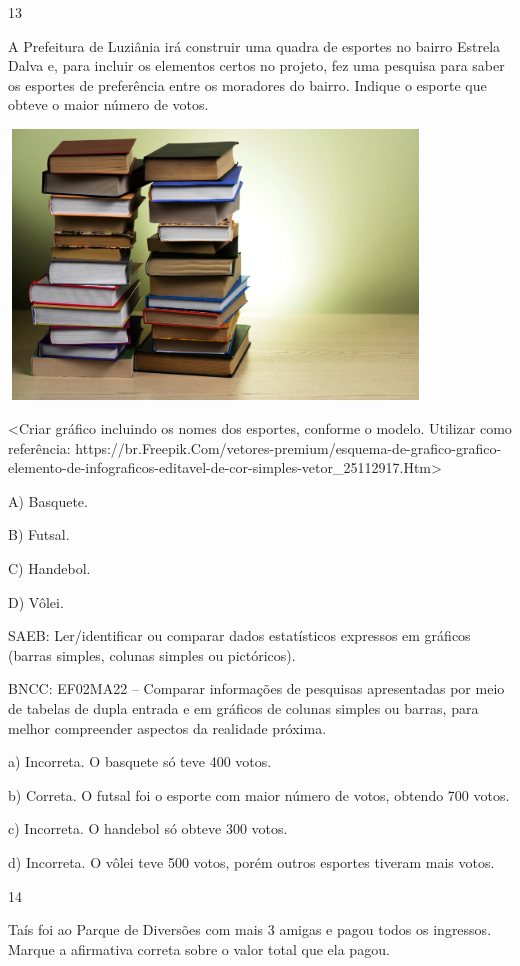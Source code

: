 \begin{escolha}
\begin{escolha}
{{{{\num{13}

A Prefeitura de Luziânia irá construir uma quadra de esportes no bairro
Estrela Dalva e, para incluir os elementos certos no projeto, fez uma
pesquisa para saber os esportes de preferência entre os moradores
do bairro. Indique o esporte que obteve o maior número de votos.

\includegraphics[width=4.32292in,height=2.82791in]{media/image123.png}

\textless{}Criar gráfico incluindo os nomes dos esportes, conforme o
modelo. Utilizar como referência:
https://br.Freepik.Com/vetores-premium/esquema-de-grafico-grafico-elemento-de-infograficos-editavel-de-cor-simples-vetor\_25112917.Htm\textgreater{}

A) Basquete.

B) Futsal.

C) Handebol.

D) Vôlei.

SAEB: Ler/identificar ou comparar dados estatísticos expressos
em gráficos (barras simples, colunas simples ou pictóricos).

BNCC: EF02MA22 -- Comparar informações de pesquisas apresentadas por meio
de tabelas de dupla entrada e em gráficos de colunas simples ou barras,
para melhor compreender aspectos da realidade próxima.

a) Incorreta. O basquete só teve 400 votos.

b) Correta. O futsal foi o esporte com maior número de votos, obtendo 700 votos.

c) Incorreta. O handebol só obteve 300 votos.

d) Incorreta. O vôlei teve 500 votos, porém outros esportes tiveram mais votos.

\num{14}

Taís foi ao Parque de Diversões com mais 3 amigas e pagou todos os ingressos. Marque a afirmativa correta sobre o valor total que ela pagou.

}}}}
\end{escolha}
\end{escolha}
